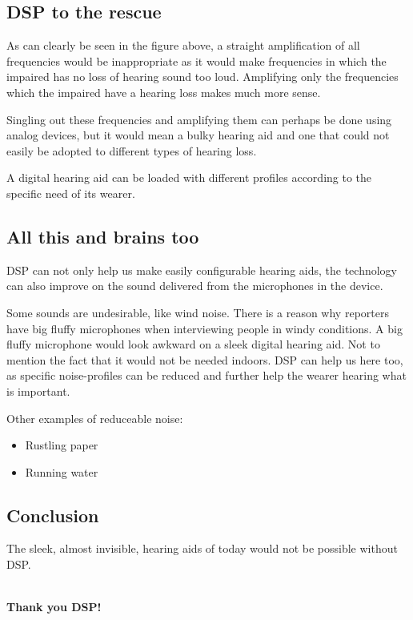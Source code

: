 \documentclass[a4wide,10pt]{article}
\begin{document}
\subsection{DSP to the rescue} %
\label{sub:dsp_to_the_rescue}
As can clearly be seen in the figure above, a straight amplification of all frequencies would be inappropriate as it would make frequencies in which the impaired has no loss of hearing sound too loud. Amplifying only the frequencies which the impaired have a hearing loss makes much more sense.

Singling out these frequencies and amplifying them can perhaps be done using analog devices, but it would mean a bulky hearing aid and one that could not easily be adopted to different types of hearing loss.

A digital hearing aid can be loaded with different profiles according to the specific need of its wearer.

\subsection{All this and brains too} %
\label{sub:all_this_and_brains_too}
DSP can not only help us make easily configurable hearing aids, the technology can also improve on the sound delivered from the microphones in the device.

Some sounds are undesirable, like wind noise. There is a reason why reporters have big fluffy microphones when interviewing people in windy conditions. A big fluffy microphone would look awkward on a sleek digital hearing aid. Not to mention the fact that it would not be needed indoors. DSP can help us here too, as specific noise-profiles can be reduced and further help the wearer hearing what is important.

Other examples of reduceable noise:

\begin{itemize}
	\item Rustling paper
	\item Running water
\end{itemize}

\subsection{Conclusion} %
\label{sub:conclusion}
The sleek, almost invisible, hearing aids of today would not be possible without DSP.
\\\\
\begin{center}
	\textbf{Thank you DSP!}
\end{center}
\end{document}
